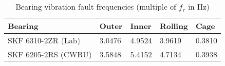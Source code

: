 \begin{table}[H]
	\renewcommand{\arraystretch}{1.3}
	\caption{Bearing  vibration fault frequencies (multiple of $f_r$ in Hz)} \label{Tab:bearingFault} \centering
	\begin{tabular}{m{4.5cm}|m{1.5cm}m{1.5cm}m{1.5cm}m{1.5cm}}
		\hline \hline
		Bearing & Outer & Inner & Rolling & Cage\\
		\hline
		SKF 6310-2ZR (Lab) & 3.0476 & 4.9524 & 3.9619 & 0.3810\\
		SKF 6205-2RS (CWRU)& 3.5848 & 5.4152 & 4.7134 & 0.3938\\
		\hline
	\end{tabular}
\end{table}